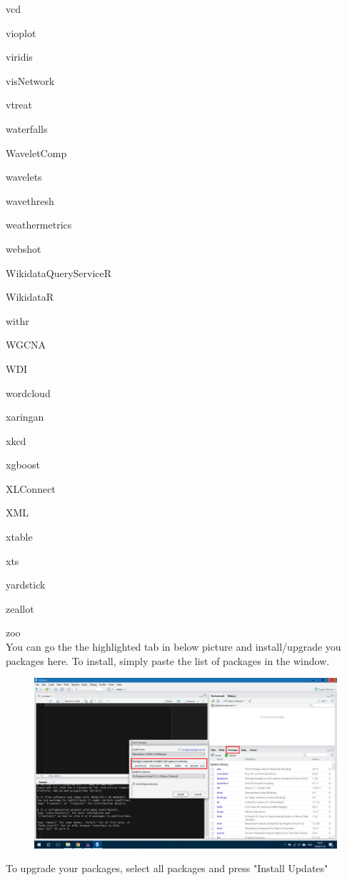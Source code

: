\documentclass[10pt]{article} %
\begin{document}
\begin{itemize}
    vcd

    vioplot

    viridis

    visNetwork

    vtreat

    waterfalls

    WaveletComp

    wavelets

    wavethresh

    weathermetrics

    webshot

    WikidataQueryServiceR

    WikidataR

    withr

    WGCNA

    WDI

    wordcloud

    xaringan

    xkcd

    xgboost

    XLConnect

    XML

    xtable

    xts

    yardstick

    zeallot

    zoo
  \\

  You can go the the highlighted tab in below picture and install/upgrade you packages here.
  To install, simply paste the list of packages in the window.

  \begin{figure}[h!]
    \centering
    \includegraphics[width=0.7\linewidth]{figs/installPackages}
    \caption{}
    \label{fig:installpackages}
  \end{figure}

  To upgrade your packages, select all packages and press "Install Updates"


\end{itemize}
\end{document}
